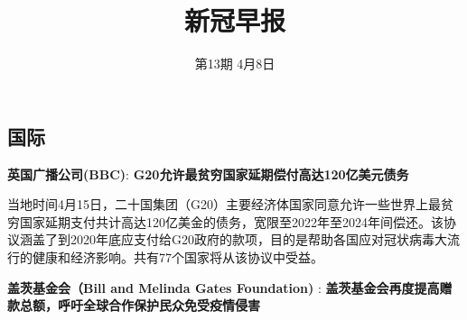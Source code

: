\documentclass[
]{article}
\title{\textcolor{glaucous}{\Huge \textbf {新冠早报}}}
\subtitle{\textcolor{glaucous}{\Large 第13期 \space 4月8日}}
\author{}
\date{\vspace{-2.5em}}
\begin{document}
\maketitle

\fontsize{13}{13}
\selectfont
\vspace{-10truemm}

\newcommand{\resheading}[1]{%
  \noindent\fcolorbox{lavenderblush}{lavenderblush}{\makebox[\dimexpr\textwidth-2\fboxsep-2\fboxrule][l]{\textbf{~#1}}}%
}

\pagestyle{fancyplain}

\renewcommand{\headrulewidth}{0pt}
\setlength{\headheight}{25pt} 
\setlength{\headsep}{-15pt}

%
  \noindent{}%

\hypertarget{section}{%
\subsection{\texorpdfstring{\textcolor{glaucous}{\Large 国际}}{}}\label{section}}

\textbf{\textcolor{glaucous}{英国广播公司(BBC)}}:
\textbf{G20允许最贫穷国家延期偿付高达120亿美元债务 }

当地时间4月15日，二十国集团（G20）主要经济体国家同意允许一些世界上最贫穷国家延期支付共计高达120亿美金的债务，宽限至2022年至2024年间偿还。该协议涵盖了到2020年底应支付给G20政府的款项，目的是帮助各国应对冠状病毒大流行的健康和经济影响。共有77个国家将从该协议中受益。

\textbf{\textcolor{glaucous}{盖茨基金会（Bill and Melinda Gates Foundation)}}
: \textbf{盖茨基金会再度提高赠款总额，呼吁全球合作保护民众免受疫情侵害}
\end{document}
